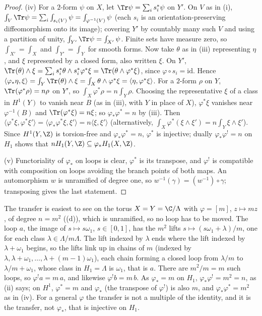 \begin{proof}
(iv) For a $2$-form $\psi$ on $X$, let $\Tr\psi=\sum_is_i^*\psi$ on $Y'$. On $V$ as in (i), $\int_V\Tr\psi=\sum_i\int_{s_i(V)}\psi=\int_{\varphi^{-1}(V)}\psi$ (each $s_i$ is an orientation-preserving
diffeomorphism onto its image); covering $Y'$ by countably many such $V$ and using a partition of unity, $\int_{Y'}\Tr\psi=\int_{X'}\psi$. Finite sets have measure zero, so
$\int_{X'}=\int_X$ and $\int_{Y'}=\int_Y$ for smooth forms. Now take $\theta$ as in (iii) representing $\eta$, and $\xi$ represented by a closed form, also written $\xi$. On $Y'$,
$\Tr(\theta)\wedge\xi=\sum_is_i^*\theta\wedge s_i^*\varphi^*\xi=\Tr(\theta\wedge\varphi^*\xi)$, since $\varphi\circ s_i=\mathrm{id}$. Hence
$\langle\varphi_*\eta,\xi\rangle=\int_Y\Tr(\theta)\wedge\xi=\int_X\theta\wedge\varphi^*\xi=\langle\eta,\varphi^*\xi\rangle$. For a $2$-form $\rho$ on $Y$, $\Tr(\varphi^*\rho)=n\rho$ on $Y'$, so
$\int_X\varphi^*\rho=n\int_Y\rho$. Choosing the representative $\xi$ of a class in $H^1(Y)$ to vanish near $B$ (as in (iii), with $Y$ in place of $X$), $\varphi^*\xi$ vanishes near
$\varphi^{-1}(B)$ and $\Tr(\varphi^*\xi)=n\xi$; so $\varphi_*\varphi^*=n$ by (iii). Then $\langle\varphi^*\xi,\varphi^*\xi'\rangle=\langle\varphi_*\varphi^*\xi,\xi'\rangle=n\langle\xi,\xi'\rangle$ (alternatively,
$\int_X\varphi^*(\xi\wedge\xi')=n\int_Y\xi\wedge\xi'$). Since $H^1(Y,\Z)$ is torsion-free and $\varphi_*\varphi^*=n$, $\varphi^*$ is injective; dually $\varphi_*\varphi^!=n$ on $H_1$ shows that
$nH_1(Y,\Z)\subseteq\varphi_*H_1(X,\Z)$.

(v) Functoriality of $\varphi_*$ on loops is clear, $\varphi^*$ is its transpose, and $\varphi^!$ is compatible with composition on loops avoiding the branch points of both maps.
An automorphism $w$ is unramified of degree one, so $w^{-1}(\gamma)=(w^{-1})\circ\gamma$; transposing gives the last statement.
\end{proof}

The transfer is easiest to see on the torus $X=Y=\C/\Lambda$ with $\varphi=[m]$, $z\mapsto mz$, of degree $n=m^2$ ((d)), which is unramified, so no
loop has to be moved. The loop $a$, the image of $s\mapsto s\omega_1$, $s\in[0,1]$, has the $m^2$ lifts $s\mapsto(s\omega_1+\lambda)/m$, one for each class
$\lambda\in\Lambda/m\Lambda$. The lift indexed by $\lambda$ ends where the lift indexed by $\lambda+\omega_1$ begins, so the lifts link up in chains of $m$ (indexed by
$\lambda,\lambda+\omega_1,\dots,\lambda+(m-1)\omega_1$), each chain forming a closed loop from $\lambda/m$ to $\lambda/m+\omega_1$, whose class in $H_1=\Lambda$ is $\omega_1$, that is $a$.
There are $m^2/m=m$ such loops, so $\varphi^!a=m\,a$, and likewise $\varphi^!b=m\,b$. As $\varphi_*=m$ on $H_1$, $\varphi_*\varphi^!=m^2=n$, as (ii) says; on $H^1$,
$\varphi^*=m$ and $\varphi_*$ (the transpose of $\varphi^!$) is also $m$, and $\varphi_*\varphi^*=m^2$ as in (iv). For a general $\varphi$ the transfer is not a multiple of
the identity, and it is the transfer, not $\varphi_*$, that is injective on $H_1$.

